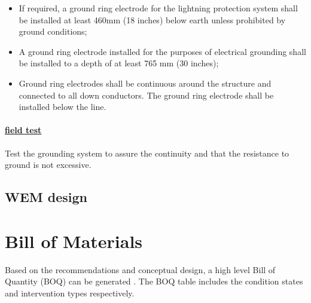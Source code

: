 \begin{itemize}
\item If required, a ground ring electrode for the lightning protection system shall be installed at least 460mm (18 inches) below earth unless prohibited by ground conditions;
\item 	A ground ring electrode installed for the purposes of electrical grounding shall be installed to a depth of at least 765 mm (30 inches);
\item 	Ground ring electrodes shall be continuous around the structure and connected to all down conductors.  The ground ring electrode shall be installed below the line.

\end{itemize}

\paragraph{\underline{field test}}
Test the grounding system to assure the continuity and that the resistance to ground is not excessive.




\subsection{WEM design}
%
\section{Bill of Materials}
Based on the recommendations and conceptual design, a high level Bill of Quantity (BOQ) can be generated . The BOQ table includes the condition states and intervention types respectively. %

